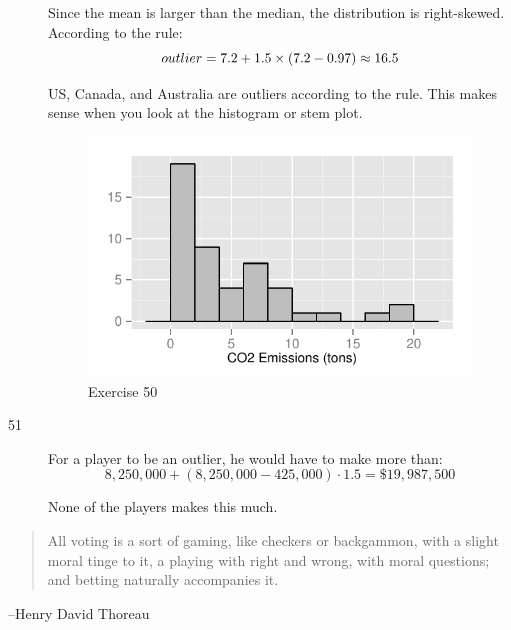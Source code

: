 \documentclass[letterpaper, landscape]{exam}
\begin{document}
\begin{description}
        Since the mean is larger than the median, the distribution is right-skewed.
        According to the rule:
        \[
          outlier = 7.2 + 1.5 \times (7.2 - 0.97) \approx 16.5 \\
        \]

        US, Canada, and Australia are outliers according to the rule.  This
        makes sense when you look at the histogram or stem plot.

        \begin{figure}[H]
          \centering
          \includegraphics{figures/ex50.pdf}
          \caption{Exercise 50}
        \end{figure}

      \item[51] 
        For a player to be an outlier, he would have to make more than:
        \[
          8,250,000 + (8,250,000 - 425,000) \cdot 1.5 = \$19,987,500
        \]

        None of the players makes this much.

    \end{description}

  \else
    \vspace{11 cm}
    \begin{quote}
      \begin{em}
        All voting is a sort of gaming, like checkers or backgammon, with a
        slight moral tinge to it, a playing with right and wrong, with moral
        questions; and betting naturally accompanies it. 

      \end{em}
    \end{quote}
    \hspace{1 cm} --Henry David Thoreau
  \fi
\end{document}

